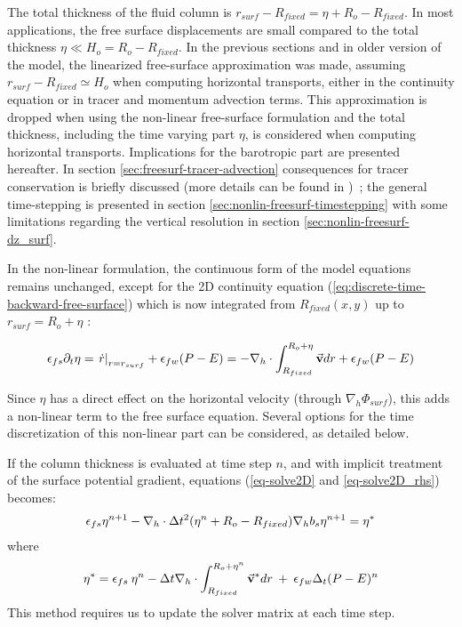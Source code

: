 The total thickness of the fluid column is $r_{surf} - R_{fixed} =
\eta + R_o - R_{fixed}$. In most applications, the free surface
displacements are small compared to the total thickness
$\eta \ll H_o = R_o - R_{fixed}$.
In the previous sections and in older version of the model,
the linearized free-surface approximation was made, assuming
$r_{surf} - R_{fixed} \simeq H_o$ when computing horizontal transports,
either in the continuity equation or in tracer and momentum
advection terms.
This approximation is dropped when using the non-linear free-surface
formulation and the total thickness, including the time varying part
$\eta$, is considered when computing horizontal transports.
Implications for the barotropic part are presented hereafter.
In section \ref{sec:freesurf-tracer-advection} consequences for
tracer conservation is briefly discussed (more details can be
found in \cite{campin:02})~; the general time-stepping is presented
in section \ref{sec:nonlin-freesurf-timestepping} with some
limitations regarding the vertical resolution in section
\ref{sec:nonlin-freesurf-dz_surf}.

In the non-linear formulation, the continuous form of the model
equations remains unchanged, except for the 2D continuity equation
(\ref{eq:discrete-time-backward-free-surface}) which is now
integrated from $R_{fixed}(x,y)$ up to $r_{surf}=R_o+\eta$ :

\begin{displaymath}
\epsilon_{fs} \partial_t \eta =
\left. \dot{r} \right|_{r=r_{surf}} + \epsilon_{fw} (P-E) =
- {\bf \nabla}_h \cdot \int_{R_{fixed}}^{R_o+\eta} \vec{\bf v} dr
+ \epsilon_{fw} (P-E)
\end{displaymath}

Since $\eta$ has a direct effect on the horizontal velocity (through
$\nabla_h \Phi_{surf}$), this adds a non-linear term to the free
surface equation. Several options for the time discretization of this
non-linear part can be considered, as detailed below.

If the column thickness is evaluated at time step $n$, and with
implicit treatment of the surface potential gradient, equations
(\ref{eq-solve2D} and \ref{eq-solve2D_rhs}) becomes:
\begin{eqnarray*}
\epsilon_{fs} {\eta}^{n+1} -
{\bf \nabla}_h \cdot \Delta t^2 (\eta^{n}+R_o-R_{fixed})
{\bf \nabla}_h b_s {\eta}^{n+1}
= {\eta}^*
\end{eqnarray*}
where
\begin{eqnarray*}
{\eta}^* = \epsilon_{fs} \: {\eta}^{n} -
\Delta t {\bf \nabla}_h \cdot \int_{R_{fixed}}^{R_o+\eta^n} \vec{\bf v}^* dr
\: + \: \epsilon_{fw} \Delta_t (P-E)^{n}
\end{eqnarray*}
This method requires us to update the solver matrix at each time step.

